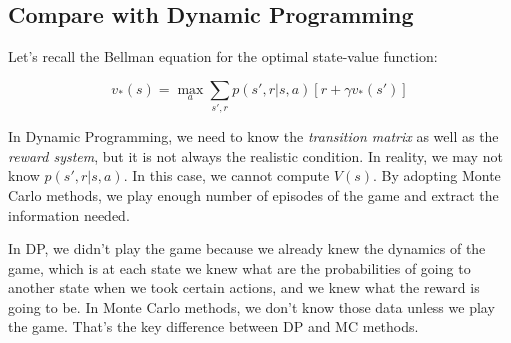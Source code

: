 \documentclass{article}
\begin{document}
\subsection{Compare with Dynamic Programming}

Let's recall the Bellman equation for the optimal state-value function:

\[v_*(s) = \max_a\sum_{s', r} p(s',r|s,a) \left[ r + \gamma v_*(s')\right]\]

In Dynamic Programming, we need to know the \emph{transition matrix} as well as the \emph{reward system}, but it is not always the realistic condition. In reality, we may not know $p(s',r|s,a)$. In this case, we cannot compute $V(s)$. By adopting Monte Carlo methods, we play enough number of episodes of the game and extract the information needed.

In DP, we didn't play the game because we already knew the dynamics of the game, which is at each state we knew what are the probabilities of going to another state when we took certain actions, and we knew what the reward is going to be. In Monte Carlo methods, we don't know those data unless we play the game. That's the key difference between DP and MC methods.
\end{document}
